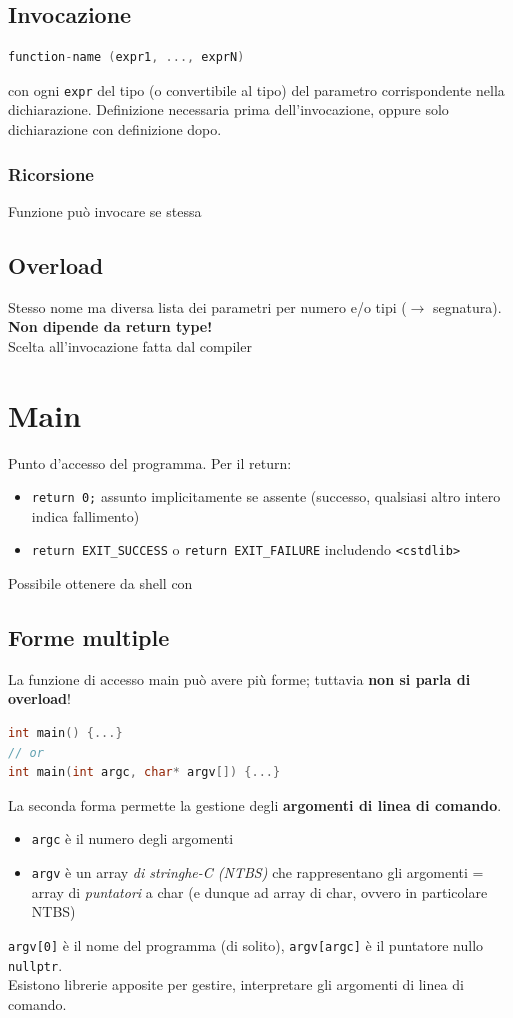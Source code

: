 \documentclass[10pt, oneside]{book}
\begin{document}
\subsection{Invocazione}
\begin{lstlisting}[language=C++]
function-name (expr1, ..., exprN)
\end{lstlisting}
con ogni \texttt{expr} del tipo (o convertibile al tipo) del parametro corrispondente nella dichiarazione. Definizione necessaria prima dell'invocazione, oppure solo dichiarazione con definizione dopo.\\
\subsubsection{Ricorsione}
Funzione può invocare se stessa

\subsection{Overload}
Stesso nome ma diversa lista dei parametri per numero e/o tipi ($\rightarrow$ segnatura). \textbf{Non dipende da return type!}\\
Scelta all'invocazione fatta dal compiler

\section{Main}
Punto d'accesso del programma. Per il return:
\begin{itemize}
\item \texttt{return 0;} assunto implicitamente se assente (successo, qualsiasi altro intero indica fallimento)
\item \texttt{return EXIT\_SUCCESS} o \texttt{return EXIT\_FAILURE} includendo \texttt{<cstdlib>}
\end{itemize}
Possibile ottenere da shell con 

\subsection{Forme multiple}
La funzione di accesso main può avere più forme; tuttavia \textbf{non si parla di overload}!
\begin{lstlisting}[language=C++]
int main() {...}
// or
int main(int argc, char* argv[]) {...}
\end{lstlisting}
La seconda forma permette la gestione degli \textbf{argomenti di linea di comando}.
\begin{itemize}
\item \texttt{argc} è il numero degli argomenti
\item \texttt{argv} è un array \textit{di stringhe-C (NTBS)} che rappresentano gli argomenti = array di \textit{puntatori} a char (e dunque ad array di char, ovvero in particolare NTBS)
\end{itemize}
\texttt{argv[0]} è il nome del programma (di solito), \texttt{argv[argc]} è il puntatore nullo \texttt{nullptr}.\\
Esistono librerie apposite per gestire, interpretare gli argomenti di linea di comando.
\end{document}
